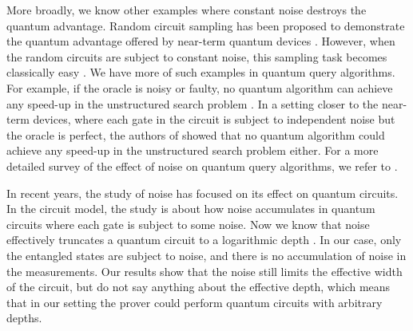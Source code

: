 \documentclass[10pt,a4paper]{article}
\theoremstyle{plain}
\theoremstyle{definition}
\newcommand{\1}{\mathbb{1}} %
\begin{document}
More broadly, we know other examples where constant noise destroys the quantum advantage.
Random circuit sampling has been proposed to demonstrate the quantum advantage offered by near-term quantum devices \cite{boixo2018characterizing}.
However, when the random circuits are subject to constant noise, this sampling task becomes classically easy \cite{aharonov2023polynomial}.
We have more of such examples in quantum query algorithms. For example, if the oracle is noisy or faulty, no
quantum algorithm can achieve any speed-up in the unstructured search problem \cite{regev2008impossibility}.
In a setting closer to the near-term devices, where each gate in the circuit is subject to independent noise but the oracle is perfect,
the authors of \cite{chen2022complexity} showed that no quantum algorithm could achieve any speed-up in the unstructured search problem either.
For a more detailed survey of the effect of noise on quantum query algorithms, we refer to \cite[Section 3]{chen2022complexity}.

In recent years, the study of noise has focused on its effect on quantum circuits. In the circuit model, the study is about how noise accumulates in quantum circuits where each gate is subject to some noise. Now we know that noise effectively truncates a quantum circuit to a logarithmic depth \cite{mele2024noise}.
In our case, only the entangled states are subject to noise, and there is no accumulation of noise in the measurements. Our results show that the noise still limits the effective width of the circuit, but do not say anything about the effective depth, which means
that in our setting the prover could perform quantum circuits with arbitrary depths.
\end{document}
